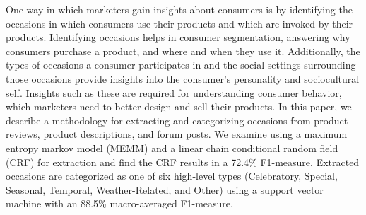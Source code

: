 One way in which marketers gain insights about consumers is by identifying the occasions in which consumers use their products and which are invoked by their products. Identifying occasions helps in consumer segmentation,  answering why consumers purchase a product, and  where and when they use it. Additionally, the types of occasions a consumer participates in and the social settings surrounding those occasions provide insights into the consumer's personality and sociocultural self. Insights such as these are required for understanding consumer behavior, which marketers need to better design and sell their products.  In this paper, we describe a methodology for extracting and categorizing occasions from product reviews, product descriptions, and forum posts. We examine using a maximum entropy markov model (MEMM) and a linear chain conditional random field (CRF) for extraction and find the CRF results in a 72.4\% F1-measure. Extracted occasions are categorized as one of six high-level types (Celebratory, Special, Seasonal, Temporal, Weather-Related, and Other) using a support vector machine with an 88.5\% macro-averaged F1-measure.
